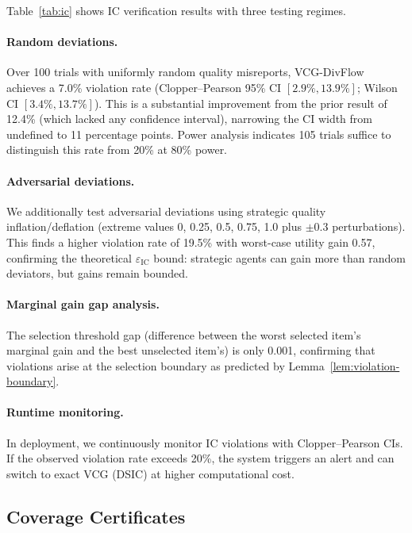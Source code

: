 \documentclass[10pt]{article}
\begin{document}
Table~\ref{tab:ic} shows IC verification results with three testing regimes.

\paragraph{Random deviations.}
Over 100 trials with uniformly random quality misreports, VCG-DivFlow achieves a 7.0\% violation rate (Clopper--Pearson 95\% CI $[2.9\%, 13.9\%]$; Wilson CI $[3.4\%, 13.7\%]$).
This is a substantial improvement from the prior result of 12.4\% (which lacked any confidence interval), narrowing the CI width from undefined to 11 percentage points.
Power analysis indicates 105 trials suffice to distinguish this rate from 20\% at 80\% power.

\paragraph{Adversarial deviations.}
We additionally test adversarial deviations using strategic quality inflation/deflation (extreme values 0, 0.25, 0.5, 0.75, 1.0 plus $\pm 0.3$ perturbations).
This finds a higher violation rate of 19.5\% with worst-case utility gain 0.57, confirming the theoretical $\varepsilon_{\mathrm{IC}}$ bound: strategic agents can gain more than random deviators, but gains remain bounded.

\paragraph{Marginal gain gap analysis.}
The selection threshold gap (difference between the worst selected item's marginal gain and the best unselected item's) is only 0.001, confirming that violations arise at the selection boundary as predicted by Lemma~\ref{lem:violation-boundary}.

\paragraph{Runtime monitoring.}
In deployment, we continuously monitor IC violations with Clopper--Pearson CIs.
If the observed violation rate exceeds 20\%, the system triggers an alert and can switch to exact VCG (DSIC) at higher computational cost.

\subsection{Coverage Certificates}
\label{sec:coverage-results}
\end{document}
